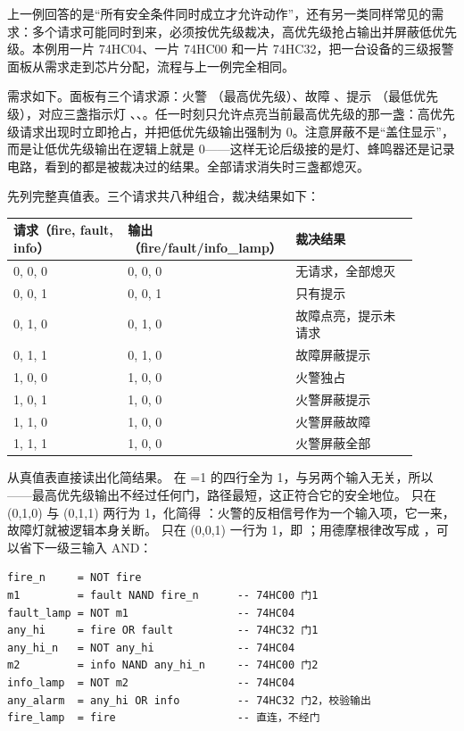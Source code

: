 上一例回答的是“所有安全条件同时成立才允许动作”，还有另一类同样常见的需求：多个请求可能同时到来，必须按优先级裁决，高优先级抢占输出并屏蔽低优先级。本例用一片 74HC04、一片 74HC00 和一片 74HC32，把一台设备的三级报警面板从需求走到芯片分配，流程与上一例完全相同。

需求如下。面板有三个请求源：火警 （最高优先级）、故障 、提示 （最低优先级），对应三盏指示灯 、、。任一时刻只允许点亮当前最高优先级的那一盏：高优先级请求出现时立即抢占，并把低优先级输出强制为 0。注意屏蔽不是“盖住显示”，而是让低优先级输出在逻辑上就是 0——这样无论后级接的是灯、蜂鸣器还是记录电路，看到的都是被裁决过的结果。全部请求消失时三盏都熄灭。

先列完整真值表。三个请求共八种组合，裁决结果如下：

\begin{longtable}{L{0.28\linewidth}L{0.32\linewidth}L{0.3\linewidth}}
\toprule
请求（fire, fault, info） & 输出（fire/fault/info\_lamp） & 裁决结果 \\
, 0, 0 & 0, 0, 0 & 无请求，全部熄灭 \\
0, 0, 1 & 0, 0, 1 & 只有提示 \\
0, 1, 0 & 0, 1, 0 & 故障点亮，提示未请求 \\
0, 1, 1 & 0, 1, 0 & 故障屏蔽提示 \\
1, 0, 0 & 1, 0, 0 & 火警独占 \\
1, 0, 1 & 1, 0, 0 & 火警屏蔽提示 \\
1, 1, 0 & 1, 0, 0 & 火警屏蔽故障 \\
1, 1, 1 & 1, 0, 0 & 火警屏蔽全部 \\
\bottomrule
\end{longtable}

从真值表直接读出化简结果。 在 =1 的四行全为 1，与另两个输入无关，所以 ——最高优先级输出不经过任何门，路径最短，这正符合它的安全地位。 只在 (0,1,0) 与 (0,1,1) 两行为 1，化简得 ：火警的反相信号作为一个输入项，它一来，故障灯就被逻辑本身关断。 只在 (0,0,1) 一行为 1，即 ；用德摩根律改写成 ，可以省下一级三输入 AND：

\begin{lstlisting}
fire_n     = NOT fire
m1         = fault NAND fire_n      -- 74HC00 门1
fault_lamp = NOT m1                 -- 74HC04
any_hi     = fire OR fault          -- 74HC32 门1
any_hi_n   = NOT any_hi             -- 74HC04
m2         = info NAND any_hi_n     -- 74HC00 门2
info_lamp  = NOT m2                 -- 74HC04
any_alarm  = any_hi OR info         -- 74HC32 门2，校验输出
fire_lamp  = fire                   -- 直连，不经门
\end{lstlisting}

